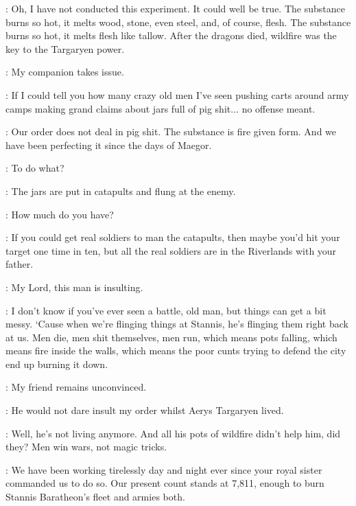 \HALLYN: Oh, I have not conducted this experiment. It could well be true. The substance burns so hot, it melts wood, stone, even steel, and, of course, flesh. The substance burns so hot, it melts flesh like tallow. After the dragons died, wildfire was the key to the Targaryen power. 


\TYRION: My companion takes issue. 

\BRONN: If I could tell you how many crazy old men I've seen pushing carts around army camps making grand claims about jars full of pig shit$\ldots$ no offense meant. 

\HALLYN: Our order does not deal in pig shit. The substance is fire given form. And we have been perfecting it since the days of Maegor. 

\BRONN: To do what? 

\HALLYN: The jars are put in catapults and flung at the enemy. 

\TYRION: How much do you have? 


\BRONN: If you could get real soldiers to man the catapults, then maybe you'd hit your target one time in ten, but all the real soldiers are in the Riverlands with your father. 

\HALLYN: My Lord, this man is insulting. 


\BRONN: I don't know if you've ever seen a battle, old man, but things can get a bit messy. `Cause when we're flinging things at Stannis, he's flinging them right back at us. Men die, men shit themselves, men run, which means pots falling, which means fire inside the walls, which means the poor cunts trying to defend the city end up burning it down. 

\TYRION: My friend remains unconvinced. 

\HALLYN: He would not dare insult my order whilst Aerys Targaryen lived. 

\BRONN: Well, he's not living anymore. And all his pots of wildfire didn't help him, did they? Men win wars, not magic tricks. 


\HALLYN: We have been working tirelessly day and night ever since your royal sister commanded us to do so. Our present count stands at 7,811, enough to burn Stannis Baratheon's fleet and armies both. 

